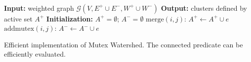 \begin{algorithm}[h]
 \hrulefill \\
   \textbf{Input: }
     weighted graph $\mathcal{G}(V,  E^+\cup E^-, W^+\cup W^-)$\;
      \textbf{Output: }
     clusters defined by active set $A^+$\;
  \textbf{Initialization: }
     $A^+ = \emptyset $; \quad
     $A^- = \emptyset $\;
 {
   {
    {
          $\mathrm{merge}(i, j)$: $A^+ \leftarrow A^+ \cup e$\;
    }
   }{
      {
          $\mathrm{addmutex}(i, j)$: $A^- \leftarrow A^- \cup e$\;
      }
   }
 } \vspace{-6pt}\hrulefill
 \vspace{6pt}
 \caption{Efficient implementation of Mutex Watershed. The $\mathrm{connected}$ predicate can be efficiently evaluated.}
 \label{algo_code_efficient}
\end{algorithm}

